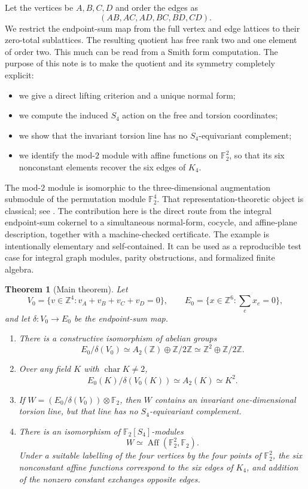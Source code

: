 \documentclass[11pt]{amsart}
\newtheorem{theorem}{Theorem}[section]
\theoremstyle{definition}
\theoremstyle{remark}
\newcommand{\Z}{\mathbb Z}
\newcommand{\F}{\mathbb F}
\newcommand{\Aff}{\operatorname{Aff}}
\begin{document}
Let the vertices be $A,B,C,D$ and order the edges as
\[
(AB,AC,AD,BC,BD,CD).
\]
We restrict the endpoint-sum map from the full vertex and edge lattices to their zero-total sublattices. The resulting quotient has free rank two and one element of order two. This much can be read from a Smith form computation. The purpose of this note is to make the quotient and its symmetry completely explicit:
\begin{itemize}[leftmargin=2em]
\item we give a direct lifting criterion and a unique normal form;
\item we compute the induced $S_4$ action on the free and torsion coordinates;
\item we show that the invariant torsion line has no $S_4$-equivariant complement;
\item we identify the mod-$2$ module with affine functions on $\F_2^2$, so that its six nonconstant elements recover the six edges of $K_4$.
\end{itemize}

The mod-$2$ module is isomorphic to the three-dimensional augmentation submodule of the permutation module $\F_2^4$. That representation-theoretic object is classical; see \cite{Benson,JamesKerber}. The contribution here is the direct route from the integral endpoint-sum cokernel to a simultaneous normal-form, cocycle, and affine-plane description, together with a machine-checked certificate. The example is intentionally elementary and self-contained. It can be used as a reproducible test case for integral graph modules, parity obstructions, and formalized finite algebra.

\begin{theorem}[Main theorem]\label{thm:main}
Let
\[
V_0=\{v\in\Z^4:v_A+v_B+v_C+v_D=0\},\qquad
E_0=\{x\in\Z^6:\textstyle\sum_e x_e=0\},
\]
and let $\delta:V_0\to E_0$ be the endpoint-sum map.
\begin{enumerate}[label=(\roman*),leftmargin=2em]
\item There is a constructive isomorphism of abelian groups
\[
E_0/\delta(V_0)\simeq A_2(\Z)\oplus\Z/2\Z
\simeq\Z^2\oplus\Z/2\Z.
\]
\item Over any field $K$ with $\operatorname{char}K\ne2$,
\[
E_0(K)/\delta(V_0(K))\simeq A_2(K)\simeq K^2.
\]
\item If $W=(E_0/\delta(V_0))\otimes\F_2$, then $W$ contains an invariant one-dimensional torsion line, but that line has no $S_4$-equivariant complement.
\item There is an isomorphism of $\F_2[S_4]$-modules
\[
W\simeq\Aff(\F_2^2,\F_2).
\]
Under a suitable labelling of the four vertices by the four points of $\F_2^2$, the six nonconstant affine functions correspond to the six edges of $K_4$, and addition of the nonzero constant exchanges opposite edges.
\end{enumerate}
\end{theorem}
\end{document}
